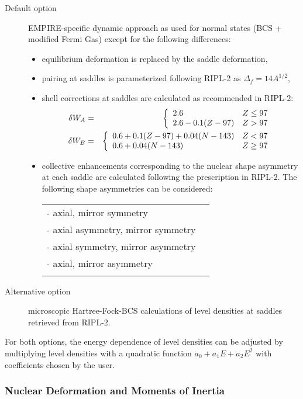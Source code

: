 \begin{description}
\item[Default option] EMPIRE-specific dynamic approach as used for normal
states (BCS + modified Fermi Gas) except for the following differences:

\begin{itemize}
\item equilibrium deformation is replaced by the saddle deformation,

\item pairing at saddles is parameterized following RIPL-2 as $%
\Delta_{f}=14A^{1/2}$,

\item shell corrections at saddles are calculated as recommended in RIPL-2: 
\begin{eqnarray}
\delta W_{A}&=&\left\{ 
\begin{array}{lr}
2.6 & Z\leq97 \\ 
2.6-0.1(Z-97) & Z>97%
\end{array}%
\right.  \notag \\
\delta W_{B}&=&\left\{ 
\begin{array}{lr}
0.6+0.1(Z-97)+0.04(N-143) & Z<97 \\ 
0.6+0.04(N-143) & Z\geq97%
\end{array}%
\right.  \notag
\end{eqnarray}

\item collective enhancements corresponding to the nuclear shape asymmetry
at each saddle are calculated following the prescription in RIPL-2. The
following shape asymmetries can be considered: 
\begin{tabular}{ll}
- axial, mirror symmetry\tabularnewline - axial asymmetry, mirror symmetry%
\tabularnewline - axial symmetry, mirror asymmetry\tabularnewline - axial,
mirror asymmetry \tabularnewline & 
\end{tabular}
\end{itemize}

\item[Alternative option] microscopic Hartree-Fock-BCS calculations of level
densities at saddles retrieved from RIPL-2.
\end{description}

For both options, the energy dependence of level densities can be adjusted
by multiplying level densities with a quadratic function $%
a_{0}+a_{1}E+a_{2}E^{2}$ with coefficients chosen by the user.

\subsubsection{Nuclear Deformation and Moments of Inertia\label{sec: defor}}

